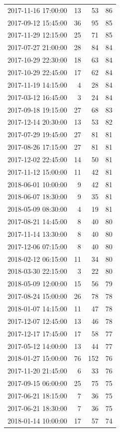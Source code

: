 \begin{tabular}{lrrr}
2017-11-16 17:00:00 & 13 & 53 & 86 \\
2017-09-12 15:45:00 & 36 & 95 & 85 \\
2017-11-29 12:15:00 & 25 & 71 & 85 \\
2017-07-27 21:00:00 & 28 & 84 & 84 \\
2017-10-29 22:30:00 & 18 & 63 & 84 \\
2017-10-29 22:45:00 & 17 & 62 & 84 \\
2017-11-19 14:15:00 & 4 & 28 & 84 \\
2017-03-12 16:45:00 & 3 & 24 & 84 \\
2017-09-18 19:15:00 & 27 & 68 & 83 \\
2017-12-14 20:30:00 & 13 & 53 & 82 \\
2017-07-29 19:45:00 & 27 & 81 & 81 \\
2017-08-26 17:15:00 & 27 & 81 & 81 \\
2017-12-02 22:45:00 & 14 & 50 & 81 \\
2017-11-12 15:00:00 & 11 & 42 & 81 \\
2018-06-01 10:00:00 & 9 & 42 & 81 \\
2018-06-07 18:30:00 & 9 & 35 & 81 \\
2018-05-09 08:30:00 & 4 & 19 & 81 \\
2017-08-21 14:45:00 & 8 & 40 & 80 \\
2017-11-14 13:30:00 & 8 & 40 & 80 \\
2017-12-06 07:15:00 & 8 & 40 & 80 \\
2018-02-12 06:15:00 & 11 & 34 & 80 \\
2018-03-30 22:15:00 & 3 & 22 & 80 \\
2018-05-09 12:00:00 & 15 & 56 & 79 \\
2017-08-24 15:00:00 & 26 & 78 & 78 \\
2018-01-07 14:15:00 & 11 & 47 & 78 \\
2017-12-07 12:45:00 & 13 & 46 & 78 \\
2017-12-17 17:45:00 & 17 & 58 & 77 \\
2017-05-12 14:00:00 & 13 & 44 & 77 \\
2018-01-27 15:00:00 & 76 & 152 & 76 \\
2017-11-20 21:45:00 & 6 & 33 & 76 \\
2017-09-15 06:00:00 & 25 & 75 & 75 \\
2017-06-21 18:15:00 & 7 & 36 & 75 \\
2017-06-21 18:30:00 & 7 & 36 & 75 \\
2018-01-14 10:00:00 & 17 & 57 & 74 \\

\end{tabular}
